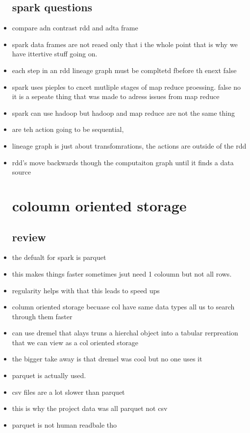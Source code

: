 \documentclass{article}
\begin{document}
\begin{itemize}
\subsection*{spark questions}
\item compare adn contrast rdd and adta frame 
\item spark data frames are not reaed only that i the whole point that is why we have ittertive stuff going on.  
\item each step in an rdd lineage graph must be compltetd fbefore th enext false 
\item spark uses pieples to cncet mutliple stages of map reduce proessing. false no it is a sepeate thing that was made to adress issues from map reduce
\item spark can use hadoop but hadoop and map reduce are not the same thing 
\item are teh action going to be sequential, 
\item lineage graph is just about transfomrations, the actions are outside of the rdd 
\item rdd's move backwards though the computaiton graph until it finds a data source

\section*{coloumn oriented storage }
\subsection*{review}
\item the defualt for spark is parquet 
\item this makes things faster sometimes jsut need 1 coloumn but not all rows. 
\item regularity helps with that this leads to speed ups
\item column oriented storage becuase col have same data types all us to search through them faster
\item can use dremel that alays truns a hierchal object into a tabular rerpreation that we can view as a col oriented storage
\item the bigger take away is that dremel was cool but no one uses it 
\item parquet is actually used. 
\item csv files are a lot slower than parquet 
\item this is why the project data was all parquet not csv
\item parquet is not human readbale tho 

\end{itemize}
\end{document}
